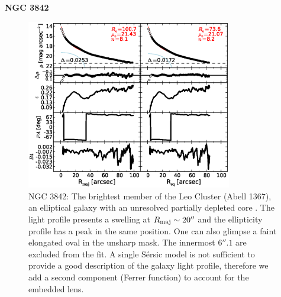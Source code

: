 \documentclass[preprint2]{emulateapj}
\newcommand{\fitfigurewidth}{0.8\textwidth}
\begin{document}
  \clearpage\newpage\noindent
  {\bf NGC 3842 \\}
  
  \begin{figure}[h]
  \begin{center}
  \includegraphics[width=\fitfigurewidth]{images/n3842exp_1Dfit.eps}
  \caption{NGC 3842: 
  The brightest member of the Leo Cluster (Abell 1367), 
  an elliptical galaxy with an unresolved partially depleted core \citep{rusli2013,dullograham2014cores}. %
  The light profile presents a swelling at $R_{\rm maj} \sim 20''$ and the ellipticity profile has a peak in the same position.
  One can also glimpse a faint elongated oval in the unsharp mask.
  The innermost $6''.1$ are excluded from the fit.
  A single S\'ersic model is not sufficient to provide a good description of the galaxy light profile, 
  therefore we add a second component (Ferrer function) to account for the embedded lens.
  }
  \end{center}
  \end{figure}
\end{document}
